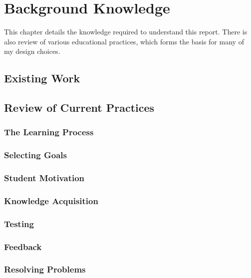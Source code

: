 \chapter{Background Knowledge}
\label{chapter:background}
  This chapter details the knowledge required to understand this report. There is also review of various educational practices, which forms the basis for many of my design choices.

  \section{Existing Work}
  \section{Review of Current Practices}
    \subsection{The Learning Process}
    \subsection{Selecting Goals}
    \subsection{Student Motivation}
    \subsection{Knowledge Acquisition}
    \subsection{Testing}
    \subsection{Feedback}
    \subsection{Resolving Problems}
